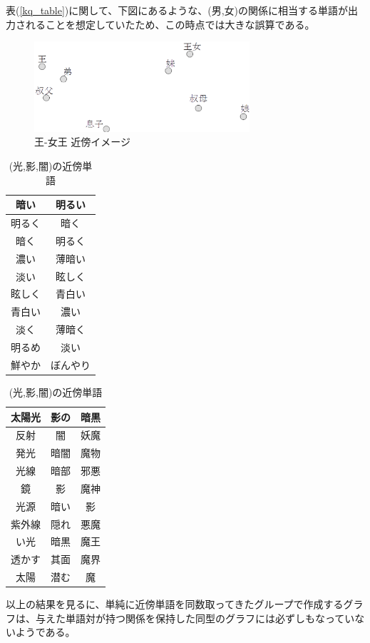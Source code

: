 表(\ref{kq_table})に関して、下図にあるような、(男,女)の関係に相当する単語が出力されることを想定していたため、この時点では大きな誤算である。
\begin{figure}[h]
  \centering
  \includegraphics[width=8cm]{../images/kq_fv.eps}
  \caption{王-女王 近傍イメージ}
  \label{kq_fv}
\end{figure}

\begin{table}[h]
  \begin{minipage}[t]{.33\textwidth}
    \caption[(明るい,暗い)]{(明るい,暗い)の近傍単語}
    \begin{center}
      \begin{tabular}{|c|c|} \hline
        暗い & 明るい \\ \hline
        明るく & 暗く \\
        暗く & 明るく \\
        濃い & 薄暗い \\
        淡い & 眩しく \\
        眩しく & 青白い \\
        青白い & 濃い \\
        淡く & 薄暗く \\
        明るめ & 淡い \\
        鮮やか & ぼんやり \\ \hline
      \end{tabular}
    \end{center}
  \end{minipage}
  \begin{minipage}[t]{.66\textwidth}
    \caption[(光,影,闇)]{(光,影,闇)の近傍単語}
    \begin{center}
      \begin{tabular}{|c|c|c|} \hline
        太陽光 & 影の & 暗黒 \\ \hline
        反射 & 闇 & 妖魔 \\
        発光 & 暗闇 & 魔物 \\
        光線 & 暗部 & 邪悪 \\
        鏡 & 影 & 魔神 \\
        光源 & 暗い & 影 \\
        紫外線 & 隠れ & 悪魔 \\
        い光 & 暗黒 & 魔王 \\
        透かす & 其面 & 魔界 \\
        太陽 & 潜む & 魔 \\ \hline
      \end{tabular}
    \end{center}
  \end{minipage}
\end{table}
以上の結果を見るに、単純に近傍単語を同数取ってきたグループで作成するグラフは、与えた単語対が持つ関係を保持した同型のグラフには必ずしもなっていないようである。
